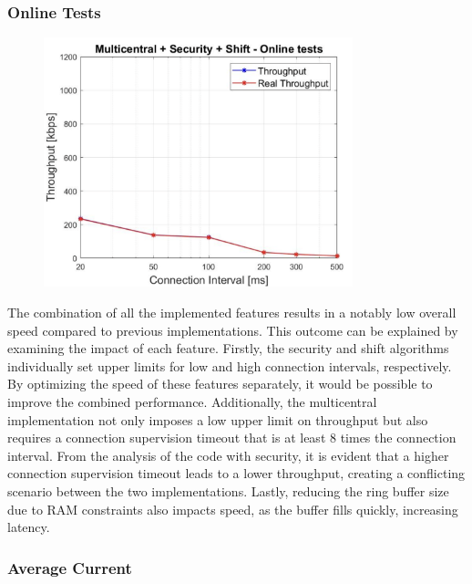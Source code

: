 \documentclass{Configuration_Files/PoliMi3i_thesis}
\begin{document}
\subsubsection*{Online Tests}

\begin{figure}[h!]
    \centering
    \includegraphics[width=0.8\textwidth]{Results Manuel/figure31}
    \label{fig:figure1}
\end{figure}

The combination of all the implemented features results in a notably low overall speed compared to previous implementations. This outcome can be explained by examining the impact of each feature. Firstly, the security and shift algorithms individually set upper limits for low and high connection intervals, respectively. By optimizing the speed of these features separately, it would be possible to improve the combined performance. Additionally, the multicentral implementation not only imposes a low upper limit on throughput but also requires a connection supervision timeout that is at least 8 times the connection interval. From the analysis of the code with security, it is evident that a higher connection supervision timeout leads to a lower throughput, creating a conflicting scenario between the two implementations. Lastly, reducing the ring buffer size due to RAM constraints also impacts speed, as the buffer fills quickly, increasing latency.

\subsubsection*{Average Current}
\end{document}
